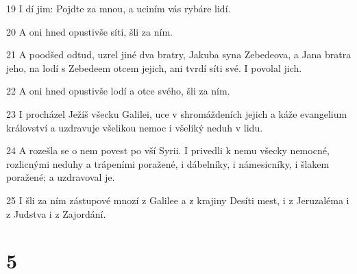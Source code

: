 \par 19 I dí jim: Pojdte za mnou, a uciním vás rybáre lidí.
\par 20 A oni hned opustivše síti, šli za ním.
\par 21 A poodšed odtud, uzrel jiné dva bratry, Jakuba syna Zebedeova, a Jana bratra jeho, na lodí s Zebedeem otcem jejich, ani tvrdí síti své. I povolal jich.
\par 22 A oni hned opustivše lodí a otce svého, šli za ním.
\par 23 I procházel Ježíš všecku Galilei, uce v shromáždeních jejich a káže evangelium království a uzdravuje všelikou nemoc i všeliký neduh v lidu.
\par 24 A rozešla se o nem povest po vší Syrii. I privedli k nemu všecky nemocné, rozlicnými neduhy a trápeními poražené, i dábelníky, i námesicníky, i šlakem poražené; a uzdravoval je.
\par 25 I šli za ním zástupové mnozí z Galilee a z krajiny Desíti mest, i z Jeruzaléma i z Judstva i z Zajordání.

\chapter{5}

